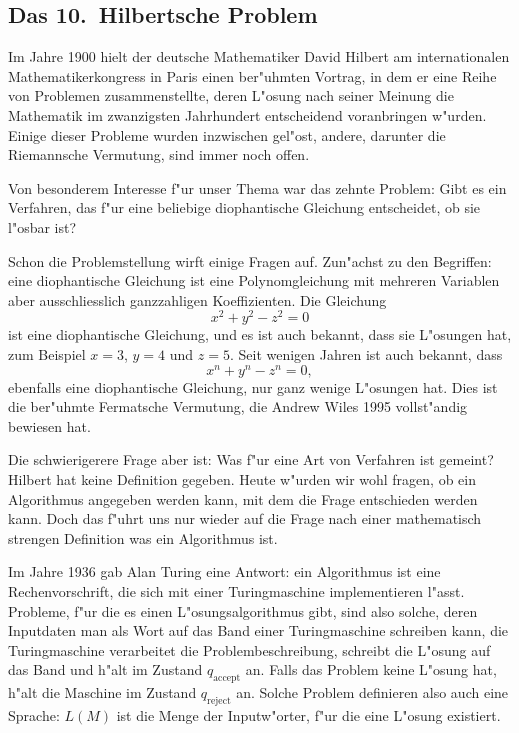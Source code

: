 \subsection{Das 10.~Hilbertsche Problem}
Im Jahre 1900 hielt der deutsche Mathematiker David Hilbert am
internationalen Mathematikerkongress in Paris einen ber"uhmten Vortrag,
in dem er eine Reihe von Problemen zusammenstellte, deren L"osung
nach seiner Meinung die Mathematik im zwanzigsten Jahrhundert
entscheidend voranbringen w"urden. Einige dieser Probleme wurden
inzwischen gel"ost, andere, darunter die Riemannsche Vermutung,
sind immer noch offen.

Von besonderem Interesse f"ur unser Thema war das zehnte Problem:
Gibt es ein Verfahren, das f"ur eine beliebige diophantische Gleichung
entscheidet, ob sie l"osbar ist?

Schon die Problemstellung wirft einige Fragen auf.
Zun"achst zu den Begriffen:
eine diophantische Gleichung ist eine
Polynomgleichung mit mehreren Variablen aber ausschliesslich
ganzzahligen Koeffizienten. Die Gleichung
\[
x^2+y^2-z^2=0
\]
ist eine diophantische Gleichung, und es ist auch bekannt, dass sie
L"osungen hat, zum Beispiel $x=3$, $y=4$ und $z=5$. Seit wenigen
Jahren ist auch bekannt, dass
\[
x^n+y^n-z^n=0,
\]
ebenfalls eine diophantische Gleichung, nur ganz wenige L"osungen hat.
Dies ist die ber"uhmte Fermatsche Vermutung, die Andrew Wiles 1995
vollst"andig bewiesen hat.

Die schwierigerere Frage aber ist: Was f"ur eine Art von Verfahren
ist gemeint? Hilbert hat keine Definition gegeben. Heute w"urden
wir wohl fragen, ob ein Algorithmus angegeben werden kann, mit dem
die Frage entschieden werden kann. Doch das f"uhrt uns nur wieder
auf die Frage nach einer  mathematisch strengen Definition was
ein Algorithmus ist.

Im Jahre 1936 gab Alan Turing eine Antwort: ein Algorithmus ist eine
Rechenvorschrift, die sich mit einer Turingmaschine implementieren
l"asst. Probleme, f"ur die es einen L"osungsalgorithmus gibt, sind
also solche, deren Inputdaten man als Wort auf das Band einer
Turingmaschine schreiben kann, die Turingmaschine verarbeitet die
Problembeschreibung, schreibt die L"osung auf das Band und h"alt im
Zustand $q_{\text{accept}}$ an. Falls das Problem keine L"osung hat,
h"alt die Maschine im Zustand $q_{\text{reject}}$ an. Solche
Problem definieren also auch eine Sprache: $L(M)$ ist die
Menge der Inputw"orter, f"ur die eine L"osung existiert.

